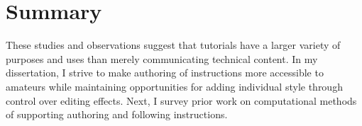 

\section{Summary}

These studies and observations suggest that tutorials have a larger variety of purposes and uses than merely communicating technical content.
%
In my dissertation, I strive to make authoring of instructions more accessible to amateurs while maintaining opportunities for adding individual style through control over editing effects.
%
Next, I survey prior work on computational methods of supporting authoring and following instructions.
